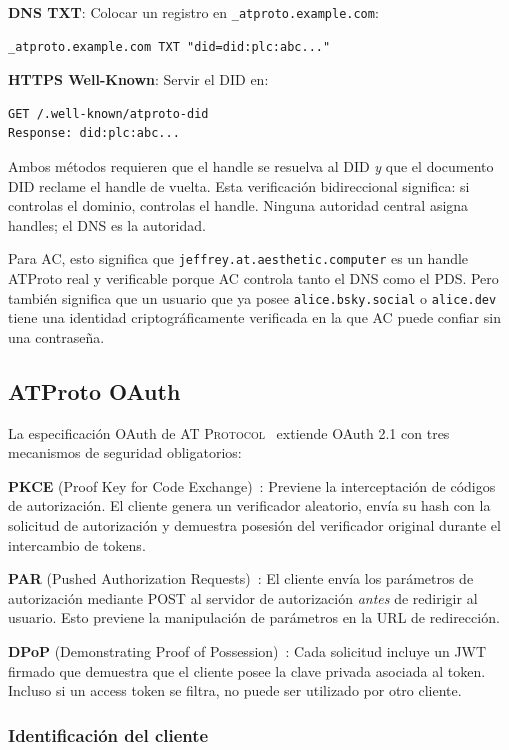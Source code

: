 \documentclass[10pt,letterpaper,twocolumn]{article}
\newcommand{\atproto}{\textsc{AT Protocol}}
\begin{document}
\textbf{DNS TXT}: Colocar un registro en \texttt{\_atproto.example.com}:
\begin{lstlisting}
_atproto.example.com TXT "did=did:plc:abc..."
\end{lstlisting}

\textbf{HTTPS Well-Known}: Servir el DID en:
\begin{lstlisting}
GET /.well-known/atproto-did
Response: did:plc:abc...
\end{lstlisting}

Ambos métodos requieren que el handle se resuelva al DID \emph{y} que el documento DID reclame el handle de vuelta. Esta verificación bidireccional significa: si controlas el dominio, controlas el handle. Ninguna autoridad central asigna handles; el DNS es la autoridad.

Para AC, esto significa que \texttt{jeffrey.at.aesthetic.computer} es un handle ATProto real y verificable porque AC controla tanto el DNS como el PDS. Pero también significa que un usuario que ya posee \texttt{alice.bsky.social} o \texttt{alice.dev} tiene una identidad criptográficamente verificada en la que AC puede confiar sin una contraseña.

\subsection{ATProto OAuth}

La especificación OAuth de \atproto{}~\citep{atproto2024oauth} extiende OAuth 2.1 con tres mecanismos de seguridad obligatorios:

\textbf{PKCE} (Proof Key for Code Exchange)~\citep{rfc7636pkce}: Previene la interceptación de códigos de autorización. El cliente genera un verificador aleatorio, envía su hash con la solicitud de autorización y demuestra posesión del verificador original durante el intercambio de tokens.

\textbf{PAR} (Pushed Authorization Requests)~\citep{rfc9126par}: El cliente envía los parámetros de autorización mediante POST al servidor de autorización \emph{antes} de redirigir al usuario. Esto previene la manipulación de parámetros en la URL de redirección.

\textbf{DPoP} (Demonstrating Proof of Possession)~\citep{rfc9449dpop}: Cada solicitud incluye un JWT firmado que demuestra que el cliente posee la clave privada asociada al token. Incluso si un access token se filtra, no puede ser utilizado por otro cliente.

\subsubsection{Identificación del cliente}
\end{document}
